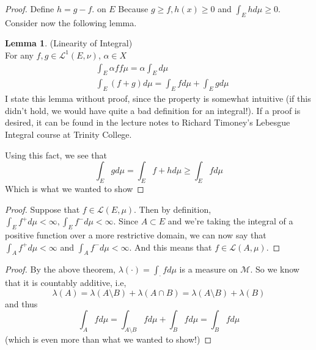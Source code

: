 \documentclass[12pt]{article}
\newenvironment{problem}[2][Problem]{\begin{trivlist}
\item[\hskip \labelsep {\bfseries #1}\hskip \labelsep {\bfseries #2.}]}{\end{trivlist}}
\theoremstyle{definition}
\theoremstyle{definition}
\newtheorem{lemma}{Lemma}[section]
\theoremstyle{definition}
\theoremstyle{definition}
\begin{document}
\begin{problem}{4.15}
\begin{proof}
Define $h = g - f.$ on $E$ Because $g \geq f, h(x) \geq 0$  and $\int_E hd\mu \geq 0 $. Consider now the following lemma.
\begin{lemma} (Linearity of Integral) \\
For any $f, g \in \mathcal{L}^1(E, \nu)$, $\alpha \in X$ 
\begin{align*}
&\int_E \alpha f f \mu = \alpha \int_E d \mu \\
&\int_E (f + g) d \mu = \int_E f d \mu + \int_E g d\mu
\end{align*}
I state this lemma without proof, since the property is somewhat intuitive (if this didn't hold, we would have quite a bad definition for an integral!). If a proof is desired, it can be found in the lecture notes to Richard Timoney's Lebesgue Integral course at Trinity College.
\end{lemma}
Using this fact, we see that 
$$\int_E g d\mu = \int_E f+h d\mu \geq \int_E f d\mu$$ 
Which is what we wanted to show
\end{proof}
\end{problem}

\begin{problem}{4.16}
\begin{proof}
Suppose that $f \in \mathcal{L}(E, \mu)$. Then by definition, $ \int_E f^+ d\mu < \infty, \int_E f^- d\mu < \infty$. Since $A \subset E$ and we're taking the integral of a positive function over a more restrictive domain, we can now say that $\int_A f^+ d\mu < \infty$ and $\int_A f^- d\mu < \infty$. And this means that $f \in \mathcal{L}(A, \mu)$.
\end{proof}
\end{problem}
\begin{problem}{4.21}
\begin{proof}
By the above theorem, $ \lambda( \cdot ) = \int_{\cdot} fd\mu $ is a measure on $\mathcal{M}$. So we know that it is countably additive, i.e, 
$$ \lambda(A) = \lambda(A \setminus B) + \lambda(A \cap B) = \lambda(A \setminus B) + \lambda(B) $$ and thus
$$ \int_A fd\mu = \int_{A \setminus B} fd\mu + \int_B fd\mu = \int_B fd\mu $$
(which is even more than what we wanted to show!)
\end{proof}
\end{problem}
\end{document}
